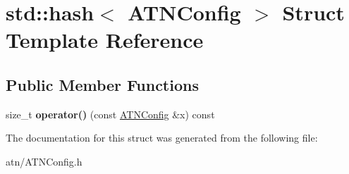 \hypertarget{structstd_1_1hash_3_01ATNConfig_01_4}{}\section{std\+:\+:hash$<$ A\+T\+N\+Config $>$ Struct Template Reference}
\label{structstd_1_1hash_3_01ATNConfig_01_4}
\subsection*{Public Member Functions}
\begin{DoxyCompactItemize}
\item 
\mbox{\label{structstd_1_1hash_3_01ATNConfig_01_4_a3b58290a2ab5ed695e1522ec87eec938}} 
size\+\_\+t {\bfseries operator()} (const \hyperlink{classantlr4_1_1atn_1_1ATNConfig}{A\+T\+N\+Config} \&x) const
\end{DoxyCompactItemize}


The documentation for this struct was generated from the following file\+:\begin{DoxyCompactItemize}
\item 
atn/A\+T\+N\+Config.\+h\end{DoxyCompactItemize}
